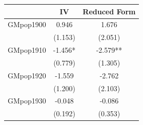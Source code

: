  \begin{tabular}{l*{2}{c}} \toprule
                &\multicolumn{1}{c}{IV}&\multicolumn{1}{c}{Reduced Form}\\
\midrule
GMpop1900       &    0.946   &    1.676   \\
                &  (1.153)   &  (2.051)   \\
\addlinespace
GMpop1910       &   -1.456*  &   -2.579** \\
                &  (0.779)   &  (1.305)   \\
\addlinespace
GMpop1920       &   -1.559   &   -2.762   \\
                &  (1.200)   &  (2.103)   \\
\addlinespace
GMpop1930       &   -0.048   &   -0.086   \\
                &  (0.192)   &  (0.353)   \\
 \bottomrule \end{tabular}
